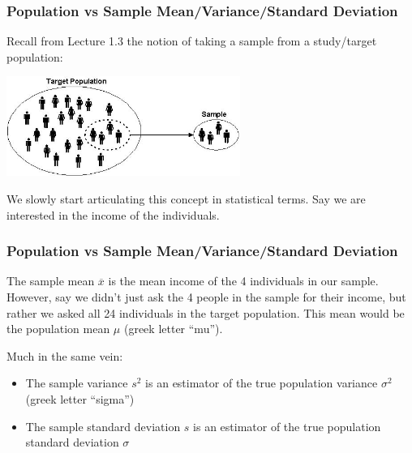\documentclass[handout]{beamer}
\newcommand{\blue}[1]{\textcolor{blue2}{#1}}
\begin{document}
\begin{frame}[fragile]
\frametitle{Population vs Sample Mean/Variance/Standard Deviation}

Recall from Lecture 1.3 the notion of taking a \blue{sample} from a \blue{study/target population}:

\vspace{0.25cm}

\begin{center}
\includegraphics[width=3in]{figure/target-population.jpg} 
\end{center}

\vspace{0.25cm}

\pause We slowly start articulating this concept in statistical terms.  Say we are interested in the income of the individuals.   

\end{frame}


\begin{frame}[fragile]
\frametitle{Population vs Sample Mean/Variance/Standard Deviation}

The \blue{sample mean $\overline{x}$} is the mean income of the 4 individuals in our sample.  However, say we didn't just ask the 4 people in the sample for their income, but rather we asked all 24 individuals in the \blue{target population}.  \pause This mean would be the \blue{population mean $\mu$ (greek letter ``mu'')}.

\vspace{0.5cm}

\pause Much in the same vein:
\begin{itemize}
\item The \blue{sample variance $s^2$} is an estimator of the true population variance $\sigma^2$ (greek letter ``sigma'')
\pause \item The \blue{sample standard deviation $s$} is an estimator of the true population standard deviation $\sigma$
\end{itemize}



\end{frame}
\end{document}
